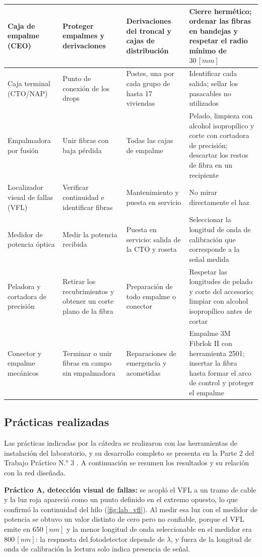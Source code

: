 \begin{longtable}{|p{2.4cm}|p{3.5cm}|p{3.2cm}|p{4.6cm}|}
    \hline
    Caja de empalme (CEO) & Proteger empalmes y derivaciones & Derivaciones del troncal y cajas de distribución & Cierre hermético; ordenar las fibras en bandejas y respetar el radio mínimo de $30 \, [mm]$ \\
    \hline
    Caja terminal (CTO/NAP) & Punto de conexión de los drops & Postes, una por cada grupo de hasta 17 viviendas & Identificar cada salida; sellar los pasacables no utilizados \\
    \hline
    Empalmadora por fusión & Unir fibras con baja pérdida & Todas las cajas de empalme & Pelado, limpieza con alcohol isopropílico y corte con cortadora de precisión; descartar los restos de fibra en un recipiente \\
    \hline
    Localizador visual de fallas (VFL) & Verificar continuidad e identificar fibras & Mantenimiento y puesta en servicio & No mirar directamente el haz \\
    \hline
    Medidor de potencia óptica & Medir la potencia recibida & Puesta en servicio: salida de la CTO y roseta & Seleccionar la longitud de onda de calibración que corresponde a la señal medida \\
    \hline
    Peladora y cortadora de precisión & Retirar los recubrimientos y obtener un corte plano de la fibra & Preparación de todo empalme o conector & Respetar las longitudes de pelado y corte del accesorio; limpiar con alcohol isopropílico antes de cortar \\
    \hline
    Conector y empalme mecánicos & Terminar o unir fibras en campo sin empalmadora & Reparaciones de emergencia y acometidas & Empalme 3M Fibrlok II con herramienta 2501; insertar la fibra hasta formar el arco de control y proteger el empalme \\
    \hline
\end{longtable}

\subsection{Prácticas realizadas}
\label{sec:practicas_lab}
Las prácticas indicadas por la cátedra se realizaron con las herramientas de instalación del laboratorio, y su desarrollo completo se presenta en la Parte 2 del Trabajo Práctico N.° 3 \cite{informe_tp3}. A continuación se resumen los resultados y su relación con la red diseñada.

\textbf{Práctico A, detección visual de fallas:} se acopló el VFL a un tramo de cable y la luz roja apareció como un punto definido en el extremo opuesto, lo que confirmó la continuidad del hilo (\autoref{fig:lab_vfl}). Al medir esa luz con el medidor de potencia se obtuvo un valor distinto de cero pero no confiable, porque el VFL emite en $650 \, [nm]$ y la menor longitud de onda seleccionable en el medidor era $800 \, [nm]$: la respuesta del fotodetector depende de $\lambda$, y fuera de la longitud de onda de calibración la lectura solo indica presencia de señal.

